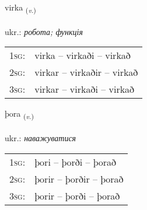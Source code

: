 \documentclass[frontgrid, backgrid]{flacards}\usepackage[]{graphicx}\usepackage[]{xcolor}
\begin{document}
\renewcommand{\flhead}{\vskip5pt \fboxsep=0pt {\small\bfseries\footnotesize Sagnorð | дієслово}}
\renewcommand{\fcfoot}{\vskip5pt \fboxsep=0pt \hspace{2pt}{\small\bfseries\footnotesize 2K}}

\renewcommand{\blhead}{\vskip5pt {\small\bfseries\footnotesize Sagnorð | дієслово }}
\renewcommand{\bcfoot}{\vskip5pt \hspace{2pt}{\small\bfseries\footnotesize 2K}}


{virka \small{\textsubscript{(\textit{v.})}} \\[1ex] %
\textphonetic{[vɪr̥ka]} \\
ukr.: \emph{робота; функція} \\  [2ex]
\renewcommand*{\arraystretch}{0.8}
\begin{tabular}{p{1cm}l}
\textsc{1sg}: & virka -- virkaði -- virkað \\ 
\textsc{2sg}: & virkar -- virkaðir -- virkað \\ 
\textsc{3sg}: & virkar -- virkaði -- virkað \\ 
\end{tabular}
}

\renewcommand{\flhead}{\vskip5pt \fboxsep=0pt {\small\bfseries\footnotesize Sagnorð | дієслово}}
\renewcommand{\fcfoot}{\vskip5pt \fboxsep=0pt \hspace{2pt}{\small\bfseries\footnotesize 2K}}

\renewcommand{\blhead}{\vskip5pt {\small\bfseries\footnotesize Sagnorð | дієслово }}
\renewcommand{\bcfoot}{\vskip5pt \hspace{2pt}{\small\bfseries\footnotesize 2K}}


{þora \small{\textsubscript{(\textit{v.})}} \\[1ex] %
\textphonetic{[θɔːra]} \\
ukr.: \emph{наважуватися} \\  [2ex]
\renewcommand*{\arraystretch}{0.8}
\begin{tabular}{p{1cm}l}
\textsc{1sg}: & þori -- þorði -- þorað \\ 
\textsc{2sg}: & þorir -- þorðir -- þorað \\ 
\textsc{3sg}: & þorir -- þorði -- þorað \\ 
\end{tabular}
}
\end{document}
